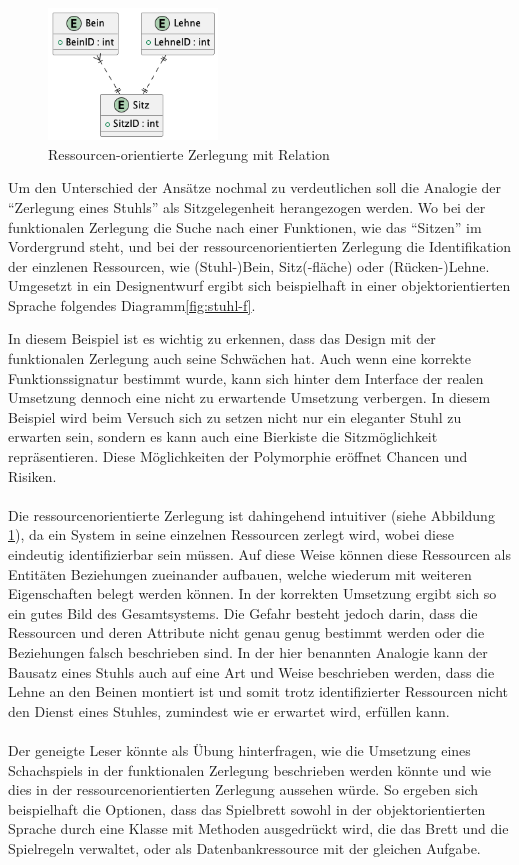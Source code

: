 \documentclass[../vs-script-first-v01.tex]{subfiles}
\begin{document}
\begin{figure}[ht!]
  \centering
  \includegraphics[width=0.4\textwidth]{fig/uml/stuhl-resourcen.png}
  \caption{Ressourcen-orientierte Zerlegung mit Relation}
  \label{fig:stuhl-r}
\end{figure}
Um den Unterschied der Ansätze nochmal zu verdeutlichen soll die Analogie der \enquote{Zerlegung eines Stuhls} als Sitzgelegenheit herangezogen werden. Wo bei der funktionalen Zerlegung die Suche nach einer Funktionen, wie das \enquote{Sitzen} im Vordergrund steht, und bei der ressourcenorientierten Zerlegung die Identifikation der einzlenen Ressourcen, wie (Stuhl-)Bein, Sitz(-fläche) oder (Rücken-)Lehne. Umgesetzt in ein Designentwurf ergibt sich beispielhaft in einer objektorientierten Sprache folgendes Diagramm\ref{fig:stuhl-f}. 

In diesem Beispiel ist es wichtig zu erkennen, dass das Design mit der funktionalen Zerlegung auch seine Schwächen hat. Auch wenn eine korrekte Funktionssignatur bestimmt wurde, kann sich hinter dem Interface der realen Umsetzung dennoch eine nicht zu erwartende Umsetzung verbergen. In diesem  Beispiel wird beim Versuch sich zu setzen nicht nur ein eleganter Stuhl zu erwarten sein, sondern es kann auch eine Bierkiste die Sitzmöglichkeit repräsentieren. Diese Möglichkeiten der Polymorphie eröffnet Chancen und Risiken.  
\\\\
Die ressourcenorientierte Zerlegung ist dahingehend intuitiver (siehe Abbildung \ref{fig:stuhl-r}), da ein System in seine einzelnen Ressourcen zerlegt wird, wobei diese eindeutig identifizierbar sein müssen. Auf diese Weise können diese Ressourcen als Entitäten Beziehungen zueinander aufbauen, welche wiederum mit weiteren Eigenschaften belegt werden können. In der korrekten Umsetzung ergibt sich so ein gutes Bild des Gesamtsystems. Die Gefahr besteht jedoch darin, dass die Ressourcen und deren Attribute nicht genau genug bestimmt werden oder die Beziehungen falsch beschrieben sind. In der hier benannten Analogie kann der Bausatz eines Stuhls auch auf eine Art und Weise beschrieben werden, dass die Lehne an den Beinen montiert ist und somit trotz identifizierter Ressourcen nicht den Dienst eines Stuhles, zumindest wie er erwartet wird, erfüllen kann.
\\\\
Der geneigte Leser könnte als Übung hinterfragen, wie die Umsetzung eines Schachspiels in der funktionalen Zerlegung beschrieben werden könnte und wie dies in der ressourcenorientierten Zerlegung aussehen würde. So ergeben sich beispielhaft die Optionen, dass das Spielbrett sowohl in der objektorientierten Sprache durch eine Klasse mit Methoden ausgedrückt wird, die das Brett und die Spielregeln verwaltet, oder als Datenbankressource mit der gleichen Aufgabe.
\end{document}
